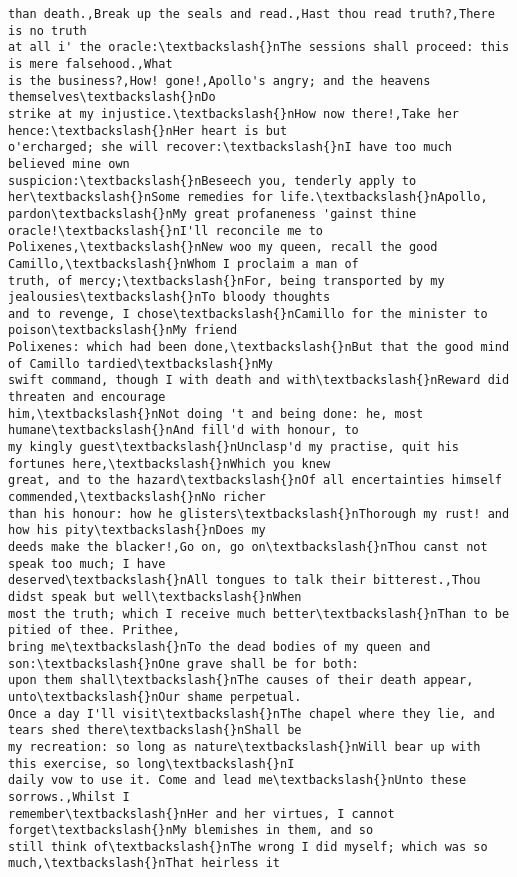 \documentclass[11pt]{article}
\begin{document}
\begin{tcolorbox}[breakable, size=fbox, boxrule=.5pt, pad at break*=1mm, opacityfill=0]
\begin{Verbatim}[commandchars=\\\{\}]
than death.,Break up the seals and read.,Hast thou read truth?,There is no truth
at all i' the oracle:\textbackslash{}nThe sessions shall proceed: this is mere falsehood.,What
is the business?,How! gone!,Apollo's angry; and the heavens themselves\textbackslash{}nDo
strike at my injustice.\textbackslash{}nHow now there!,Take her hence:\textbackslash{}nHer heart is but
o'ercharged; she will recover:\textbackslash{}nI have too much believed mine own
suspicion:\textbackslash{}nBeseech you, tenderly apply to her\textbackslash{}nSome remedies for life.\textbackslash{}nApollo,
pardon\textbackslash{}nMy great profaneness 'gainst thine oracle!\textbackslash{}nI'll reconcile me to
Polixenes,\textbackslash{}nNew woo my queen, recall the good Camillo,\textbackslash{}nWhom I proclaim a man of
truth, of mercy;\textbackslash{}nFor, being transported by my jealousies\textbackslash{}nTo bloody thoughts
and to revenge, I chose\textbackslash{}nCamillo for the minister to poison\textbackslash{}nMy friend
Polixenes: which had been done,\textbackslash{}nBut that the good mind of Camillo tardied\textbackslash{}nMy
swift command, though I with death and with\textbackslash{}nReward did threaten and encourage
him,\textbackslash{}nNot doing 't and being done: he, most humane\textbackslash{}nAnd fill'd with honour, to
my kingly guest\textbackslash{}nUnclasp'd my practise, quit his fortunes here,\textbackslash{}nWhich you knew
great, and to the hazard\textbackslash{}nOf all encertainties himself commended,\textbackslash{}nNo richer
than his honour: how he glisters\textbackslash{}nThorough my rust! and how his pity\textbackslash{}nDoes my
deeds make the blacker!,Go on, go on\textbackslash{}nThou canst not speak too much; I have
deserved\textbackslash{}nAll tongues to talk their bitterest.,Thou didst speak but well\textbackslash{}nWhen
most the truth; which I receive much better\textbackslash{}nThan to be pitied of thee. Prithee,
bring me\textbackslash{}nTo the dead bodies of my queen and son:\textbackslash{}nOne grave shall be for both:
upon them shall\textbackslash{}nThe causes of their death appear, unto\textbackslash{}nOur shame perpetual.
Once a day I'll visit\textbackslash{}nThe chapel where they lie, and tears shed there\textbackslash{}nShall be
my recreation: so long as nature\textbackslash{}nWill bear up with this exercise, so long\textbackslash{}nI
daily vow to use it. Come and lead me\textbackslash{}nUnto these sorrows.,Whilst I
remember\textbackslash{}nHer and her virtues, I cannot forget\textbackslash{}nMy blemishes in them, and so
still think of\textbackslash{}nThe wrong I did myself; which was so much,\textbackslash{}nThat heirless it

\end{Verbatim}
\end{tcolorbox}
\end{document}
